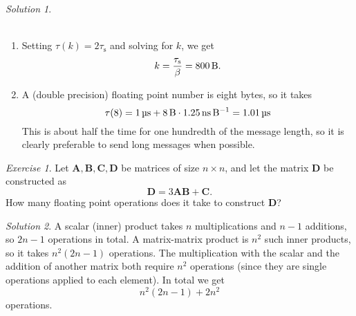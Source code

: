 \documentclass[onecolumn, oneside, a4paper, 11pt]{memoir}
\theoremstyle{remark}
\newtheorem{ex}{Exercise}
\newtheorem*{sol}{Solution}
\begin{document}
\begin{sol} \\~\\
  \begin{enumerate}
  \item Setting $\tau(k) = 2\tau_\text{s}$ and solving for $k$, we get
    \[
      k = \frac{\tau_\text{s}}{\beta} = \SI{800}{\byte}.
    \]
  \item A (double precision) floating point number is eight bytes, so it takes
    \[
      \tau(8) = \SI{1}{\micro\second} +
      \SI{8}{\byte}\cdot\SI{1.25}{\nano\second\per\byte}
      = \SI{1.01}{\micro\second}
    \]
    This is about half the time for one hundredth of the message length, so it
    is clearly preferable to send long messages when possible.
  \end{enumerate}
\end{sol}

\begin{ex}
  Let $\bm A, \bm B, \bm C, \bm D$ be matrices of size $n \times n$, and let the
  matrix $\bm D$ be constructed as
  \[
    \bm D = 3 \bm A \bm B + \bm C.
  \]
  How many floating point operations does it take to construct $\bm D$?
\end{ex}

\begin{sol}
  A scalar (inner) product takes $n$ multiplications and $n-1$ additions, so
  $2n-1$ operations in total. A matrix-matrix product is $n^2$ such inner
  products, so it takes $n^2(2n-1)$ operations. The multiplication with the
  scalar and the addition of another matrix both require $n^2$ operations (since
  they are single operations applied to each element). In total we get
  \[
    n^2(2n-1) + 2n^2
  \]
  operations.
\end{sol}
\end{document}
